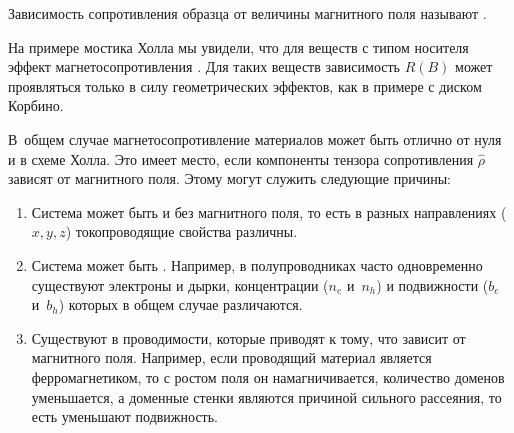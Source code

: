 Зависимость сопротивления образца от величины магнитного поля называют
.

На примере мостика Холла мы увидели, что для  веществ с
 типом носителя эффект магнетосопротивления
. Для таких веществ зависимость $R(B)$ может проявляться
только в силу геометрических эффектов, как в примере с диском Корбино.

В~общем случае магнетосопротивление материалов может быть отлично от нуля
и в схеме Холла. Это имеет место, если
 компоненты тензора сопротивления $\hat{\rho}$
зависят от магнитного поля. Этому могут служить следующие причины:
\begin{enumerate}
    \item Система может быть  и без магнитного поля, то есть в разных
направлениях ($x,y,z$) токопроводящие свойства различны.

\item Система может быть . Например, в
полупроводниках часто одновременно существуют электроны и дырки, концентрации
($n_e$ и~$n_h$) и подвижности ($b_e$ и~$b_h$) которых в общем случае
различаются.

\item Существуют  в проводимости, которые приводят
к тому, что  зависит от магнитного поля. Например, если
проводящий материал является ферромагнетиком, то с ростом поля он
намагничивается, количество доменов уменьшается, а доменные стенки являются
причиной сильного рассеяния, то есть уменьшают подвижность.
\end{enumerate}

